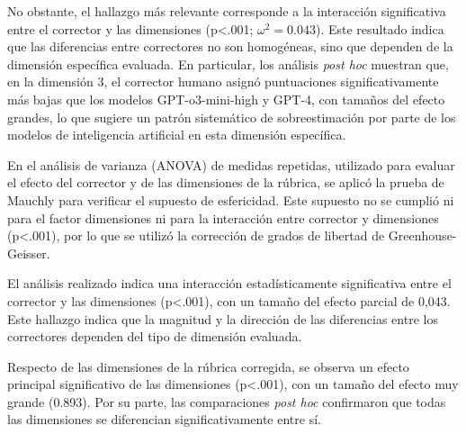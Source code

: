 \documentclass[spanish]{textolivre}
\begin{document}
No obstante, el hallazgo más relevante corresponde a la interacción significativa entre el corrector y las dimensiones (p<.001; $\omega^2 = 0.043$). Este resultado indica que las diferencias entre correctores no son homogéneas, sino que dependen de la dimensión específica evaluada. En particular, los análisis \textit{post hoc} muestran que, en la dimensión 3, el corrector humano asignó puntuaciones significativamente más bajas que los modelos GPT-o3-mini-high y GPT-4, con tamaños del efecto grandes, lo que sugiere un patrón sistemático de sobreestimación por parte de los modelos de inteligencia artificial en esta dimensión específica.

En el análisis de varianza (ANOVA) de medidas repetidas, utilizado para evaluar el efecto del corrector y de las dimensiones de la rúbrica, se aplicó la prueba de Mauchly para verificar el supuesto de esfericidad. Este supuesto no se cumplió ni para el factor dimensiones ni para la interacción entre corrector y dimensiones (p<.001), por lo que se utilizó la corrección de grados de libertad de Greenhouse-Geisser.

El análisis realizado indica una interacción estadísticamente significativa entre el corrector y las dimensiones (p<.001), con un tamaño del efecto parcial de 0,043. Este hallazgo indica que la magnitud y la dirección de las diferencias entre los correctores dependen del tipo de dimensión evaluada.

Respecto de las dimensiones de la rúbrica corregida, se observa un efecto principal significativo de las dimensiones (p<.001), con un tamaño del efecto muy grande (0.893). Por su parte, las comparaciones \textit{post hoc} confirmaron que todas las dimensiones se diferencian significativamente entre sí.
\end{document}
